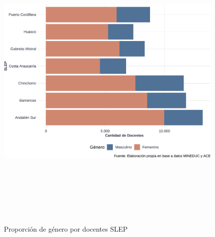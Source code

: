\documentclass[
  12pt,
  letterpaper,
]{article}
\begin{document}
\begin{figure}

{\centering \includegraphics[width=0.8\linewidth,height=6in]{tesis_ver_final_files/figure-latex/grafico-genero-1} 

}

\caption{Proporción de género por docentes SLEP}\label{fig:grafico-genero}
\end{figure}
\end{document}
